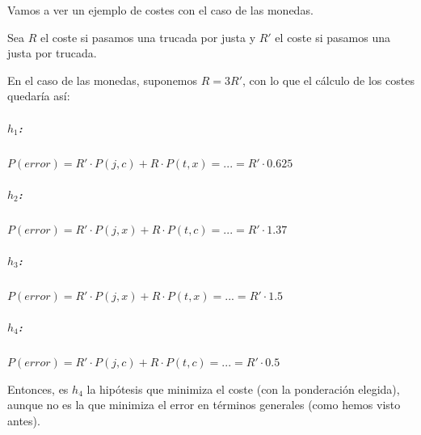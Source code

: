 \documentclass{apuntes}
\begin{document}
 \begin{example}
Vamos a ver un ejemplo de costes con el caso de las monedas.

Sea $R$ el coste si pasamos una trucada por justa y $R'$ el coste si pasamos una justa por trucada.

En el caso de las monedas, suponemos $R = 3R'$, con lo que el cálculo de los costes quedaría así:


\subparagraph{$h_1$:} $P(error) = R' · P(j,c) + R · P(t,x) = ... = R' · 0.625$
\subparagraph{$h_2$:} $P(error) = R' · P(j,x) + R · P(t,c) = ... = R' · 1.37$
\subparagraph{$h_3$:} $P(error) = R' · P(j,x) + R · P(t,x) = ... = R' · 1.5$
\subparagraph{$h_4$:} $P(error) = R' · P(j,c) + R · P(t,c) = ... = R' · 0.5$

Entonces, es $h_4$ la hipótesis que minimiza el coste (con la ponderación elegida), aunque no es la que minimiza el error en términos generales (como hemos visto antes).

 \end{example}
\end{document}
